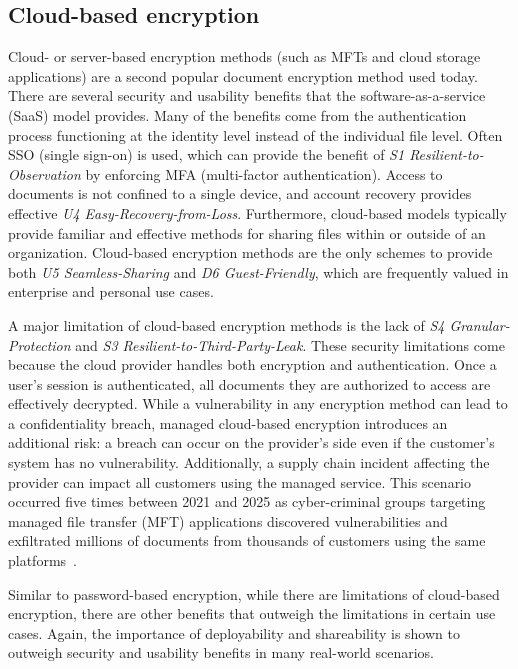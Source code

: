 \subsection{Cloud-based encryption}
\label{sec:eval-cloud}

Cloud- or server-based encryption methods (such as MFTs and cloud storage applications) are a second popular document encryption method used today. There are several security and usability benefits that the software-as-a-service (SaaS) model provides. Many of the benefits come from the authentication process functioning at the identity level instead of the individual file level. Often SSO (single sign-on) is used, which can provide the benefit of \emph{S1 Resilient-to-Observation} by enforcing MFA (multi-factor authentication). Access to documents is not confined to a single device, and account recovery provides effective \emph{U4 Easy-Recovery-from-Loss}. Furthermore, cloud-based models typically provide familiar and effective methods for sharing files within or outside of an organization. Cloud-based encryption methods are the only schemes to provide both \emph{U5 Seamless-Sharing} and \emph{D6 Guest-Friendly}, which are frequently valued in enterprise and personal use cases.

A major limitation of cloud-based encryption methods is the lack of \emph{S4 Granular-Protection} and \emph{S3 Resilient-to-Third-Party-Leak}. These security limitations come because the cloud provider handles both encryption and authentication. Once a user's session is authenticated, all documents they are authorized to access are effectively decrypted. While a vulnerability in any encryption method can lead to a confidentiality breach, managed cloud-based encryption introduces an additional risk: a breach can occur on the provider's side even if the customer's system has no vulnerability. Additionally, a supply chain incident affecting the provider can impact all customers using the managed service. This scenario occurred five times between 2021 and 2025 as cyber-criminal groups targeting managed file transfer (MFT) applications discovered vulnerabilities and exfiltrated millions of documents from thousands of customers using the same platforms~\cite{cisa_cl0p_2023,kondruss_moveit_2023,simas_unpacking_2023}.

Similar to password-based encryption, while there are limitations of cloud-based encryption, there are other benefits that outweigh the limitations in certain use cases. Again, the importance of deployability and shareability is shown to outweigh security and usability benefits in many real-world scenarios.

